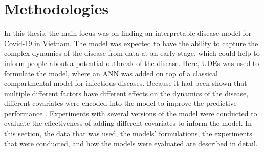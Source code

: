 \chapter{Methodologies}
\label{chap:methodologies}

In this thesis, the main focus was on finding an interpretable disease model for Covid-19 in Vietnam.
The model was expected to have the ability to capture the complex dynamics of the disease from data at an early stage, which could help to inform people about a potential outbreak of the disease.
Here, \glspl{UDE} \cite{rackauckasUniversalDifferentialEquations2020} was used to formulate the model, where an \gls{ANN} was added on top of a classical compartmental model for infectious diseases.
Because it had been shown that multiple different factors have different effects on the dynamics of the disease, different covariates were encoded into the model to improve the predictive performance \cite{ihmecovid-19forecastingteamModelingCOVID19Scenarios2021,arikInterpretableSequenceLearning}.
Experiments with several versions of the model were conducted to evaluate the effectiveness of adding different covariates to inform the model.
In this section, the data that was used, the models' formulations, the experiments that were conducted, and how the models were evaluated are described in detail.












